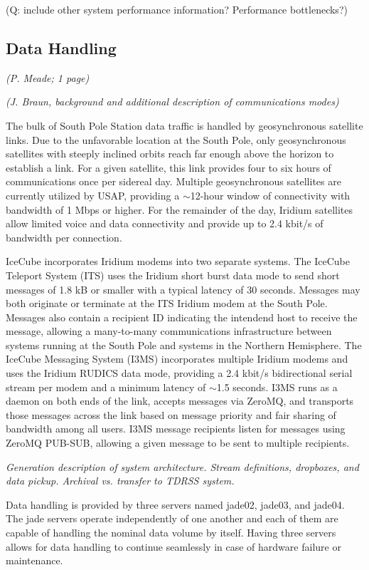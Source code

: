 (Q: include other system performance information?  Performance bottlenecks?)

\subsection{Data Handling}
\textsl{(P. Meade; 1 page)}

\textsl{(J. Braun, background and additional description of communications modes)}

The bulk of South Pole Station data traffic is handled by geosynchronous satellite links.  Due to the unfavorable
location at the South Pole, only geosynchronous satellites with steeply inclined orbits reach far enough above the
horizon to establish a link.  For a given satellite, this link provides four to six hours of communications once per
sidereal day.  Multiple geosynchronous satellites are currently utilized by USAP, providing a $\sim$12-hour window
of connectivity with bandwidth of 1 Mbps or higher.  For the remainder of the day, Iridium satellites allow
limited voice and data connectivity and provide up to 2.4 kbit/s of bandwidth per connection.

IceCube incorporates Iridium modems into two separate systems.  The IceCube Teleport System (ITS) uses the Iridium short burst
data mode to send short messages of 1.8 kB or smaller with a typical latency of 30 seconds.  Messages may both originate or terminate
at the ITS Iridium modem at the South Pole.  Messages also contain a recipient ID indicating the intendend host to receive
the message, allowing a many-to-many communications infrastructure between systems running at the South Pole and systems
in the Northern Hemisphere.  The IceCube Messaging System (I3MS) incorporates multiple Iridium modems and uses the Iridium RUDICS
data mode, providing a 2.4 kbit/s bidirectional serial stream per modem and a minimum latency of $\sim$1.5 seconds.
I3MS runs as a daemon on both ends of the link, accepts messages via ZeroMQ, and transports those messages across the link
based on message priority and fair sharing of bandwidth among all users.  I3MS message recipients listen for messages
using ZeroMQ PUB-SUB, allowing a given message to be sent to multiple recipients.

\textsl{Generation description of system architecture.  Stream definitions, dropboxes,
and data pickup.  Archival vs. transfer to TDRSS system.  }

Data handling is provided by three servers named jade02, jade03, and jade04. The jade servers operate independently of one another and
each of them are capable of handling the nominal data volume by itself. Having three servers allows for data handling to continue seamlessly
in case of hardware failure or maintenance.

